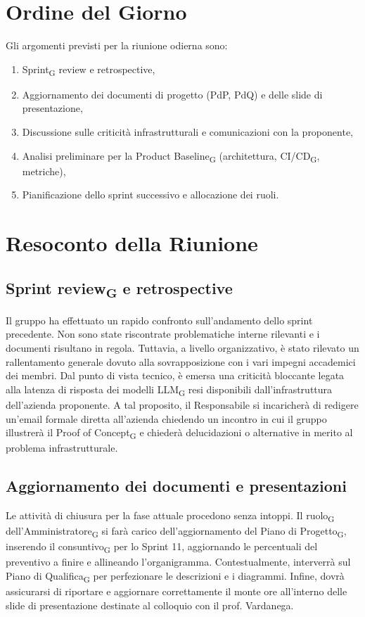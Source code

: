 \section{Ordine del Giorno}

Gli argomenti previsti per la riunione odierna sono:

\begin{enumerate}
    \item Sprint\textsubscript{G} review e retrospective,
    \item Aggiornamento dei documenti di progetto (PdP, PdQ) e delle slide di presentazione,
    \item Discussione sulle criticità infrastrutturali e comunicazioni con la proponente,
    \item Analisi preliminare per la Product Baseline\textsubscript{G} (architettura, CI/CD\textsubscript{G}, metriche),
    \item Pianificazione dello sprint successivo e allocazione dei ruoli.
\end{enumerate}


\section{Resoconto della Riunione}

\subsection{Sprint review\textsubscript{G} e retrospective}
Il gruppo ha effettuato un rapido confronto sull'andamento dello sprint precedente. Non sono state riscontrate problematiche interne rilevanti e i documenti risultano in regola. Tuttavia, a livello organizzativo, è stato rilevato un rallentamento generale dovuto alla sovrapposizione con i vari impegni accademici dei membri. Dal punto di vista tecnico, è emersa una criticità bloccante legata alla latenza di risposta dei modelli LLM\textsubscript{G} resi disponibili dall'infrastruttura dell'azienda proponente. A tal proposito, il Responsabile si incaricherà di redigere un'email formale diretta all'azienda chiedendo un incontro in cui il gruppo illustrerà il Proof of Concept\textsubscript{G} e chiederà delucidazioni o alternative in merito al problema infrastrutturale.

\subsection{Aggiornamento dei documenti e presentazioni}
Le attività di chiusura per la fase attuale procedono senza intoppi. Il ruolo\textsubscript{G} dell'Amministratore\textsubscript{G} si farà carico dell'aggiornamento del Piano di Progetto\textsubscript{G}, inserendo il consuntivo\textsubscript{G} per lo Sprint 11, aggiornando le percentuali del preventivo a finire e allineando l'organigramma. Contestualmente, interverrà sul Piano di Qualifica\textsubscript{G} per perfezionare le descrizioni e i diagrammi. Infine, dovrà assicurarsi di riportare e aggiornare correttamente il monte ore all'interno delle slide di presentazione destinate al colloquio con il prof. Vardanega.

